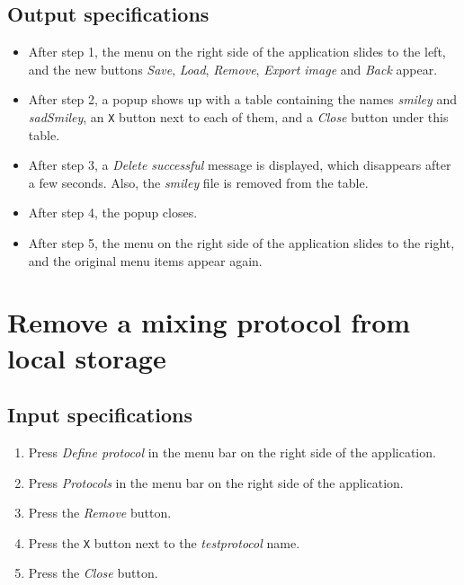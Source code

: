 \subsection*{Output specifications}
\begin{itemize}
\item After step 1, the menu on the right side of the application slides to the left, and the new buttons \emph{Save}, \emph{Load}, \emph{Remove}, \emph{Export image} and \emph{Back} appear.
\item After step 2, a popup shows up with a table containing the names \emph{smiley} and \emph{sadSmiley}, an \texttt{X} button next to each of them, and a \emph{Close} button under this table.
\item After step 3, a \emph{Delete successful} message is displayed, which disappears after a few seconds. Also, the \emph{smiley} file is removed from the table.
\item After step 4, the popup closes.
\item After step 5, the menu on the right side of the application slides to the right, and the original menu items appear again.
\end{itemize}

\section{Remove a mixing protocol from local storage}

\subsection*{Input specifications}
\begin{enumerate}
\item Press \emph{Define protocol} in the menu bar on the right side of the application.
\item Press \emph{Protocols} in the menu bar on the right side of the application.
\item Press the \emph{Remove} button.
\item Press the \texttt{X} button next to the \emph{testprotocol} name.
\item Press the \emph{Close} button.
\end{enumerate}


